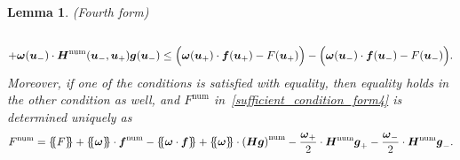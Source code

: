 \documentclass[]{scrartcl}
\newcommand*{\ldblbrace}{\{\mskip-5mu \left \{}
\newcommand*{\rdblbrace}{ \}\mskip-5mu \right \}}
\newcommand{\mean}[1]{\left\ldblbrace #1 \right\rdblbrace}
\renewcommand{\vec}[1]{\boldsymbol{#1}}
\newtheorem{lemma}[theorem]{Lemma}
\theoremstyle{definition}
\begin{document}
\begin{lemma}{\label{algebraic_lemma_nc_form4}(Fourth form)}
\begin{multline}
    \\
    + \vec{\omega}(\vec{u}_-) \cdot \vec{H}^{\mathrm{num}}(\vec{u}_-, \vec{u}_+) \vec{g}(\vec{u}_-) \leq  \Bigl ( \vec{\omega}(\vec{u}_+) \cdot \vec{f}(\vec{u}_+) - F(\vec{u}_+) \Bigr ) - \Bigl (\vec{\omega}(\vec{u}_-) \cdot \vec{f}(\vec{u}_-) - F(\vec{u}_-) \Bigr ).
\label{necessary_condition_form4}
\end{multline}
Moreover, if one of the conditions is satisfied with equality, then equality holds in the other condition as well, and $F^{\mathrm{num}}$ in~\eqref{sufficient_condition_form4} is determined uniquely as
\begin{equation}
F^{\mathrm{num}} = \mean{F} + \mean{\vec{\omega}} \cdot \vec{f}^{\mathrm{num}}-\mean{\vec{\omega} \cdot \vec{f}}  +\mean{\vec{\omega}} \cdot \left ( \vec{H}\vec{g}\right )^{\mathrm{num}} - \frac{\vec{\omega}_+}{2} \cdot \vec{H}^{\mathrm{num}} \vec{g}_+ - \frac{\vec{\omega}_-}{2} \cdot \vec{H}^{\mathrm{num}} \vec{g}_-.
\label{F_num_form4}
\end{equation}
\end{lemma}
\end{document}
